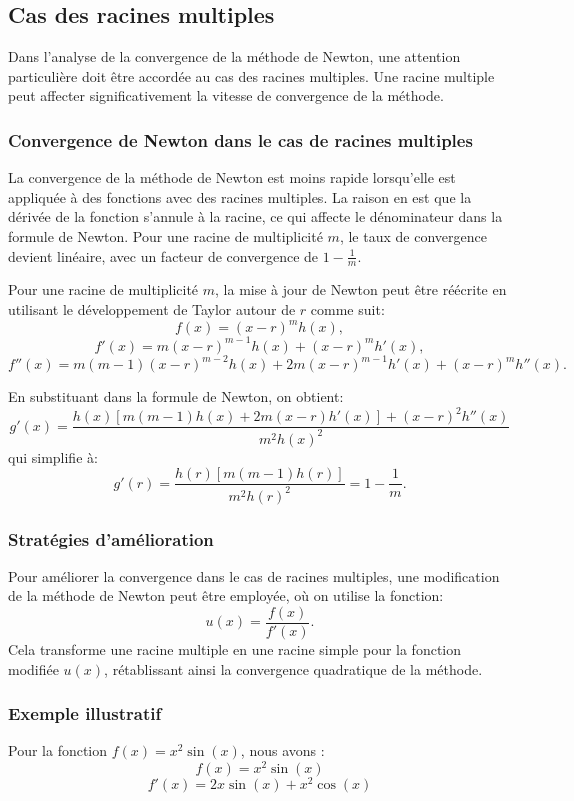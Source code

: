 \documentclass{article}
\begin{document}
\subsection{Cas des racines multiples}

Dans l'analyse de la convergence de la méthode de Newton, une attention particulière doit être accordée au cas des racines multiples. Une racine multiple peut affecter significativement la vitesse de convergence de la méthode.


\subsubsection{Convergence de Newton dans le cas de racines multiples}
La convergence de la méthode de Newton est moins rapide lorsqu'elle est appliquée à des fonctions avec des racines multiples. La raison en est que la dérivée de la fonction s'annule à la racine, ce qui affecte le dénominateur dans la formule de Newton. Pour une racine de multiplicité \(m\), le taux de convergence devient linéaire, avec un facteur de convergence de \(1 - \frac{1}{m}\).

Pour une racine de multiplicité \(m\), la mise à jour de Newton peut être réécrite en utilisant le développement de Taylor autour de \(r\) comme suit:
\[ f(x) = (x - r)^m h(x), \]
\[ f'(x) = m(x - r)^{m-1}h(x) + (x - r)^m h'(x), \]
\[ f''(x) = m(m-1)(x - r)^{m-2}h(x) + 2m(x - r)^{m-1}h'(x) + (x - r)^m h''(x). \]

En substituant dans la formule de Newton, on obtient:
\[ g'(x) = \frac{h(x) \left[ m(m - 1)h(x) + 2m(x - r)h'(x) \right] + (x - r)^2 h''(x)}{m^2 h(x)^2} \]
qui simplifie à:
\[ g'(r) = \frac{h(r) \left[ m(m - 1)h(r) \right]}{m^2 h(r)^2} = 1 - \frac{1}{m}. \]

\subsubsection{Stratégies d'amélioration}
Pour améliorer la convergence dans le cas de racines multiples, une modification de la méthode de Newton peut être employée, où on utilise la fonction:
\[ u(x) = \frac{f(x)}{f'(x)}. \]
Cela transforme une racine multiple en une racine simple pour la fonction modifiée \(u(x)\), rétablissant ainsi la convergence quadratique de la méthode.

\subsubsection{Exemple illustratif}
Pour la fonction \( f(x) = x^2 \sin(x) \), nous avons :
\[
f(x) = x^2 \sin(x)
\]
\[
f'(x) = 2x \sin(x) + x^2 \cos(x)
\]
\end{document}
